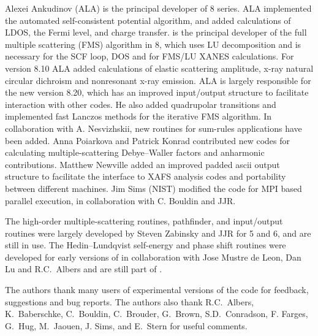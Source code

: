 \documentclass[11pt,oneside]{report} %
\begin{document}
  Alexei Ankudinov (ALA) is the principal developer of {\feff}8 series.
ALA implemented the automated self-consistent potential algorithm, and
added calculations of LDOS, the Fermi level, and charge transfer.
is the principal developer of the full
multiple scattering (FMS) algorithm in {\feff}8, which uses LU
decomposition and
is necessary for the SCF loop, DOS and for FMS/LU XANES calculations. 
For version {\feff}8.10 ALA added calculations of elastic scattering
amplitude, x-ray natural circular dichroism and nonresonant x-ray
emission.  ALA is largely responsible for the new version {\feff}8.20, which 
has an improved input/output structure to facilitate
interaction with other codes. He also added quadrupolar transitions
and implemented fast Lanczos methods for the iterative FMS algorithm.
 In collaboration with A. Nesvizhskii, new routines for sum-rules
applications have been added.  Anna Poiarkova and Patrick Konrad
contributed new codes for calculating multiple-scattering Debye--Waller
factors and anharmonic contributions.
Matthew Newville added an improved padded ascii output structure
to facilitate the interface to XAFS analysis codes and portability
between different machines. Jim Sims (NIST) modified the code for
MPI based parallel execution, in collaboration with C. Bouldin and
JJR.

 The high-order multiple-scattering
routines, pathfinder, and input/output routines were largely developed by
Steven Zabinsky and JJR for {\feff}5 and 6, and are still in use.  The
Hedin--Lundqvist self-energy and phase shift routines were developed
for early versions of {\feff} in collaboration with Jose Mustre de
Leon, Dan Lu and R.C.~Albers and are still part of {\feffcur}.

  The authors thank many users of experimental versions of the {\feffcur}
code for feedback, suggestions and bug reports.  The authors also thank R.C.\
Albers, K.\ Baberschke, C.\ Bouldin, C.\ Brouder, G.\ Brown,
S.D.\ Conradson, F. Farges, G.\ Hug, M.\ Jaouen, J. Sims, and E.\ Stern
for useful comments.
\end{document}
